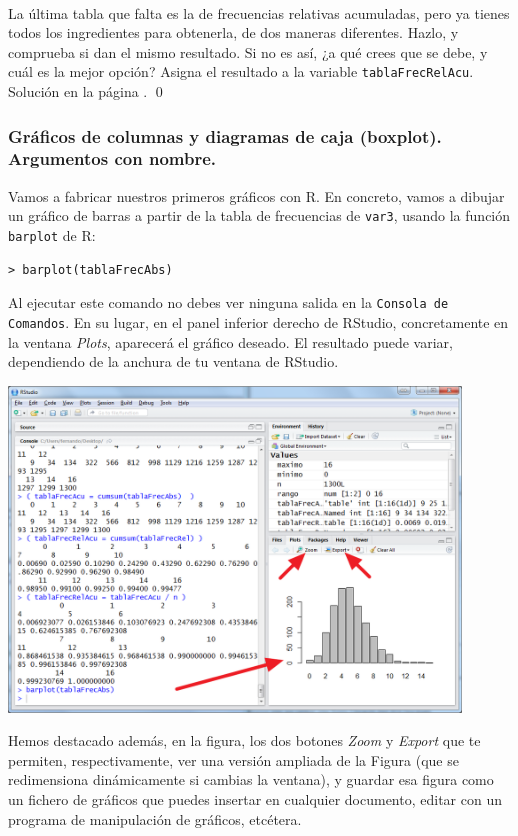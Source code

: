 \documentclass[10pt,a4paper]{article}\usepackage[]{graphicx}\usepackage[]{color}
\begin{document}
\begin{ejercicio}
\label{tut02:ejercicio13}
\quad\\
La última tabla que falta es la de frecuencias relativas acumuladas, pero ya tienes todos los ingredientes para obtenerla, de dos maneras diferentes. Hazlo, y comprueba si dan el mismo resultado.  Si no es así, ¿a qué crees que se debe, y cuál es la mejor opción? Asigna el resultado a la variable {\tt tablaFrecRelAcu}.
Solución en la página \pageref{tut02:ejercicio13:sol}.  \qed
\end{ejercicio}

\subsubsection*{Gráficos de columnas y diagramas de caja (boxplot). Argumentos con nombre.}

Vamos a fabricar nuestros primeros gráficos con R. En concreto, vamos a dibujar un gráfico de barras a partir de la tabla de frecuencias de {\tt var3}, usando la función {\tt barplot} de R:
\begin{verbatim}
> barplot(tablaFrecAbs)
\end{verbatim}
Al ejecutar este comando no debes ver ninguna salida en la {\tt Consola de Comandos}. En su lugar, en el panel inferior derecho de RStudio, concretamente en la ventana {\em Plots}, aparecerá el gráfico deseado. El resultado puede variar, dependiendo de la anchura de tu ventana de RStudio.
    \begin{center}
    \includegraphics[width=12cm]{../fig/Tut02-15a.png}
    \end{center}

Hemos destacado además, en la figura, los dos botones {\em Zoom} y {\em Export} que te permiten, respectivamente, ver una versión ampliada de la Figura (que se redimensiona dinámicamente si cambias  la ventana), y guardar esa figura como un fichero de gráficos que puedes insertar en cualquier documento, editar con un programa de manipulación de gráficos, etcétera.
\end{document}
